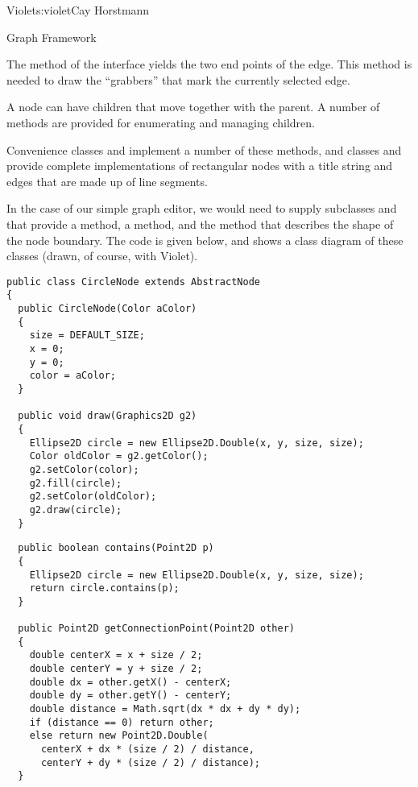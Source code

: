 \begin{aosachapter}{Violet}{s:violet}{Cay Horstmann}
\begin{aosasect1}{Graph Framework}
\begin{aosaitemize}
\item The  method of the 
  interface yields the two end points of the edge. This method is
  needed to draw the ``grabbers'' that mark the currently selected edge.

\item A node can have children that move together with the parent. A number
  of methods are provided for enumerating and managing children.

\end{aosaitemize}


Convenience classes  and 
implement a number of these methods, and classes
 and  provide complete
implementations of rectangular nodes with a title string and edges
that are made up of line segments.

In the case of our simple graph editor, we would need to supply
subclasses  and  that provide a
 method, a  method, and the
 method that describes the shape of the node
boundary.
The code is given below,
and  shows a class diagram of these classes
(drawn, of course, with Violet).

\begin{verbatim}
public class CircleNode extends AbstractNode
{
  public CircleNode(Color aColor)
  {
    size = DEFAULT_SIZE;
    x = 0;
    y = 0;
    color = aColor;
  }

  public void draw(Graphics2D g2)
  {
    Ellipse2D circle = new Ellipse2D.Double(x, y, size, size);
    Color oldColor = g2.getColor();
    g2.setColor(color);
    g2.fill(circle);
    g2.setColor(oldColor);
    g2.draw(circle);
  }
\end{verbatim}

\begin{verbatim}
  public boolean contains(Point2D p)
  {
    Ellipse2D circle = new Ellipse2D.Double(x, y, size, size);
    return circle.contains(p);
  }

  public Point2D getConnectionPoint(Point2D other)
  {
    double centerX = x + size / 2;
    double centerY = y + size / 2;
    double dx = other.getX() - centerX;
    double dy = other.getY() - centerY;
    double distance = Math.sqrt(dx * dx + dy * dy);
    if (distance == 0) return other;
    else return new Point2D.Double(
      centerX + dx * (size / 2) / distance,
      centerY + dy * (size / 2) / distance);
  }


\end{verbatim}
\end{aosasect1}
\end{aosachapter}
